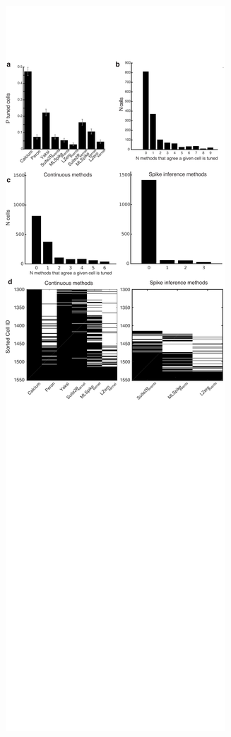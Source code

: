 \documentclass[a4paper,10pt,twocolumn]{article}
\begin{document}
\begin{figure}
\includegraphics[trim={0 375 0 0},clip,width=\textwidth]{full_figs_19v2/why_deconvolve_F4_19v2.png}

\end{figure}
\end{document}
